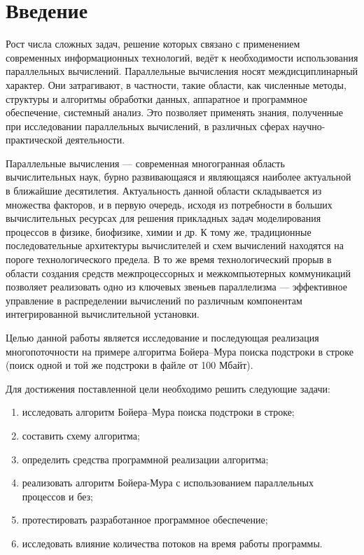 \chapter*{Введение}

Рост числа сложных задач, решение которых связано с применением современных информационных технологий, ведёт к необходимости использования параллельных вычислений. Параллельные вычисления носят междисциплинарный характер. Они затрагивают, в частности, такие области, как численные методы, структуры и алгоритмы обработки данных, аппаратное и программное обеспечение, системный анализ. Это позволяет применять знания, полученные при исследовании параллельных вычислений, в различных сферах научно-практической деятельности.


Параллельные вычисления --- современная многогранная область вычислительных наук, бурно развивающаяся и являющаяся наиболее актуальной в ближайшие десятилетия. Актуальность данной области складывается из множества факторов, и в первую очередь, исходя из потребности в больших вычислительных ресурсах для решения прикладных задач моделирования процессов в физике, биофизике, химии и др. К тому же, традиционные последовательные архитектуры вычислителей и схем вычислений находятся на пороге технологического предела. В то же время технологический прорыв в области создания средств межпроцессорных и межкомпьютерных коммуникаций позволяет реализовать одно из ключевых звеньев параллелизма --- эффективное управление в распределении вычислений по различным компонентам интегрированной вычислительной установки.


Целью данной работы является  исследование и последующая реализация многопоточности на примере алгоритма Бойера--Мура поиска подстроки в строке (поиск одной и той же подстроки в файле от 100 Мбайт).


Для достижения поставленной цели необходимо решить следующие задачи:
\begin{enumerate}
	\item исследовать алгоритм Бойера--Мура поиска подстроки в строке;
	\item составить схему алгоритма;
	\item определить средства программной реализации алгоритма;
	\item реализовать алгоритм Бойера-Мура с использованием параллельных процессов и без;
	\item протестировать разработанное программное обеспечение;
	\item исследовать влияние количества потоков на время работы программы.
\end{enumerate}

\newpage